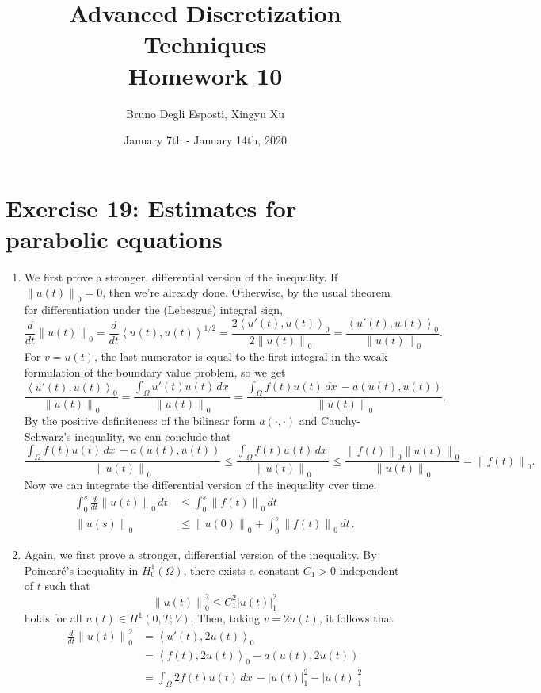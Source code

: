 \documentclass[a4paper]{article}
\title{\huge{Advanced Discretization Techniques \\ Homework 10}}
\author{\Large{Bruno Degli Esposti, Xingyu Xu}}
\date{January 7th - January 14th, 2020}
\newcommand{\dx}{\, dx \,}
\newcommand{\dt}{\, dt \,}
\newcommand{\seminorm}[1]{\left\lvert #1 \right\rvert}
\newcommand{\norm}[1]{\left\lVert #1 \right\rVert}
\newcommand{\dpair}[1]{\left\langle #1 \right\rangle}
\begin{document}
\maketitle

\section*{Exercise 19: Estimates for parabolic equations}
\begin{enumerate}[label=\textbf{\alph*)},leftmargin=*]
\item We first prove a stronger, differential version of the inequality.
	If $\norm{u(t)}_0 = 0$, then we're already done.
	Otherwise, by the usual theorem for differentiation
	under the (Lebesgue) integral sign,
	\[
	\frac{d}{dt} \norm{u(t)}_0
	= \frac{d}{dt} \dpair{u(t),u(t)}^{1/2}
	= \frac{2 \dpair{u'(t),u(t)}_0} {2 \norm{u(t)}_0}
	= \frac{\dpair{u'(t),u(t)}_0} {\norm{u(t)}_0}.
	\]
	For $v = u(t)$, the last numerator is equal to the first integral in the
	weak formulation of the boundary value problem, so we get
	\[
	\frac{\dpair{u'(t),u(t)}_0} {\norm{u(t)}_0}
	= \frac{\int_\Omega u'(t) u(t) \dx} {\norm{u(t)}_0}
	= \frac{\int_\Omega f(t) u(t) \dx - a(u(t),u(t))} {\norm{u(t)}_0}.
	\]
	By the positive definiteness of the bilinear form $a(\cdot,\cdot)$
	and Cauchy-Schwarz's inequality, we can conclude that
	\[
	\frac{\int_\Omega f(t) u(t) \dx - a(u(t),u(t))} {\norm{u(t)}_0}
	\leq \frac{\int_\Omega f(t) u(t) \dx} {\norm{u(t)}_0}
	\leq \frac{\norm{f(t)}_0 \norm{u(t)}_0} {\norm{u(t)}_0}
	= \norm{f(t)}_0.
	\]
	Now we can integrate the differential version of the inequality over time:
	\begin{align*}
	\int_0^s \frac{d}{dt} \norm{u(t)}_0 \dt
&	\leq \int_0^s \norm{f(t)}_0 \dt \\
	\norm{u(s)}_0
&	\leq \norm{u(0)}_0 + \int_0^s \norm{f(t)}_0 \dt.
	\end{align*}
\item Again, we first prove a stronger, differential version of the inequality.
	By Poincaré's inequality in $H_0^1(\Omega)$, there exists a constant $C_1 > 0$
	independent of $t$ such that
	\[
	\norm{u(t)}_0^2 \leq C_1^2 \seminorm{u(t)}_1^2
	\]
	holds for all $u(t) \in H^1(0,T;V)$.	Then, taking $v = 2u(t)$, it follows that
	\begin{align*}
	\frac{d}{dt} \norm{u(t)}_0^2
&	= \dpair{u'(t),2u(t)}_0 \\
&	= \dpair{f(t),2u(t)}_0 - a(u(t),2u(t)) \\
&	= \int_\Omega 2f(t)u(t) \dx - \seminorm{u(t)}_1^2 - \seminorm{u(t)}_1^2 \\

\end{align*}
\end{enumerate}
\end{document}
